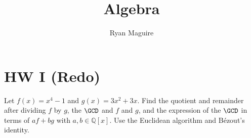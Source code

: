 \documentclass{article}                                                        %
\begin{document}
    \title{Algebra}
    \author{Ryan Maguire}
    \date{\vspace{-5ex}}
    \maketitle
    \tableofcontents
    \clearpage
    \section{HW I (Redo)}
        \begin{problem}
            Let $f(x)=x^{4}-1$ and $g(x)=3x^{2}+3x$. Find the quotient and
            remainder after dividing $f$ by $g$, the $\GCD$ and $f$ and $g$,
            and the expression of the $\GCD$ in terms of $af+bg$ with
            $a,b\in\mathbb{Q}[x]$. Use the Euclidean algorithm and B\'{e}zout's
            identity.
        \end{problem}
\end{document}
